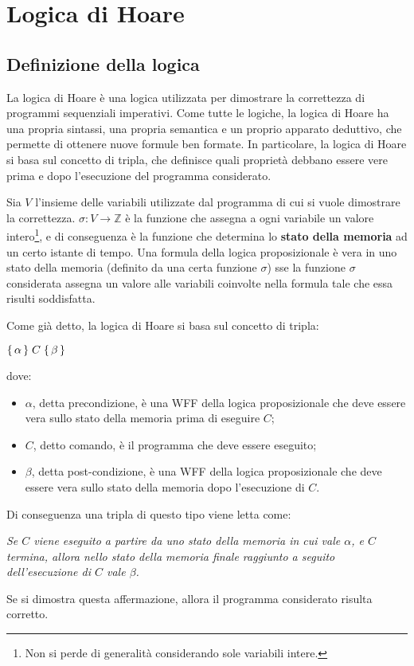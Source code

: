 \chapter{Logica di Hoare}
\section{Definizione della logica}
La logica di Hoare è una logica utilizzata per dimostrare la correttezza di
programmi sequenziali imperativi. Come tutte le logiche, la logica di Hoare
ha una propria sintassi, una propria semantica e un proprio apparato deduttivo,
che permette di ottenere nuove formule ben formate.
In particolare, la logica di Hoare si basa sul concetto di tripla, che definisce
quali proprietà debbano essere vere prima e dopo l'esecuzione del programma
considerato.

Sia $V$ l'insieme delle variabili utilizzate dal programma di cui si vuole
dimostrare la correttezza.
$\sigma: V \rightarrow \mathbb{Z}$ è la funzione che assegna
a ogni variabile un valore intero\footnote{Non si perde di generalità
considerando sole variabili intere.}, e di conseguenza è la funzione
che determina lo \textbf{stato della memoria} ad un certo istante di tempo.
Una formula della logica proposizionale è vera in uno stato della memoria
(definito da una certa funzione $\sigma$) sse la funzione $\sigma$
considerata assegna un valore alle variabili coinvolte nella formula tale
che essa risulti soddisfatta.

Come già detto, la logica di Hoare si basa sul concetto di tripla:
\begin{center}
    $\Hoaretriple{\alpha}{C}{\beta}$
\end{center}
dove:
\begin{itemize}
    \item $\alpha$, detta precondizione, è una WFF della logica proposizionale
    che deve essere vera sullo stato della memoria prima di eseguire $C$;
    \item $C$, detto comando, è il programma che deve essere eseguito;
    \item $\beta$, detta post-condizione, è una WFF della logica proposizionale
    che deve essere vera sullo stato della memoria dopo l'esecuzione di $C$.
\end{itemize}
Di conseguenza una tripla di questo tipo viene letta come:
\begin{center}
    \textit{Se $C$ viene eseguito a partire da uno stato della memoria in
    cui vale $\alpha$, e $C$ termina, allora nello stato della memoria
    finale raggiunto a seguito dell'esecuzione di $C$ vale $\beta$.}
\end{center}
Se si dimostra questa affermazione, allora il programma  considerato
risulta corretto.


